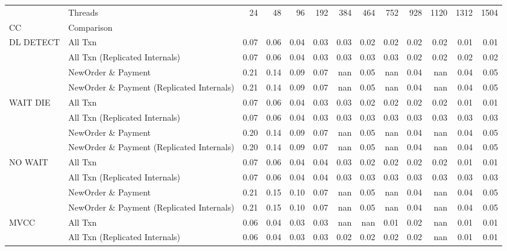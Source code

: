 \begin{tabular}{llrrrrrrrrrrr}
\toprule
       & Threads &  24   &  48   &  96   &  192  &  384  &  464  &  752  &  928  &  1120 &  1312 &  1504 \\
CC & Comparison &       &       &       &       &       &       &       &       &       &       &       \\
\midrule
DL DETECT & All Txn &  0.07 &  0.06 &  0.04 &  0.03 &  0.03 &  0.02 &  0.02 &  0.02 &  0.02 &  0.01 &  0.01 \\
       & All Txn (Replicated Internals) &  0.07 &  0.06 &  0.04 &  0.03 &  0.03 &  0.03 &  0.03 &  0.02 &  0.02 &  0.02 &  0.02 \\
       & NewOrder \& Payment &  0.21 &  0.14 &  0.09 &  0.07 &   nan &  0.05 &   nan &  0.04 &   nan &  0.04 &  0.05 \\
       & NewOrder \& Payment (Replicated Internals) &  0.21 &  0.14 &  0.09 &  0.07 &   nan &  0.05 &   nan &  0.04 &   nan &  0.04 &  0.05 \\
WAIT DIE & All Txn &  0.07 &  0.06 &  0.04 &  0.03 &  0.03 &  0.02 &  0.02 &  0.02 &  0.02 &  0.01 &  0.01 \\
       & All Txn (Replicated Internals) &  0.07 &  0.06 &  0.04 &  0.03 &  0.03 &  0.03 &  0.03 &  0.03 &  0.03 &  0.03 &  0.03 \\
       & NewOrder \& Payment &  0.20 &  0.14 &  0.09 &  0.07 &   nan &  0.05 &   nan &  0.04 &   nan &  0.04 &  0.05 \\
       & NewOrder \& Payment (Replicated Internals) &  0.20 &  0.14 &  0.09 &  0.07 &   nan &  0.05 &   nan &  0.04 &   nan &  0.04 &  0.05 \\
NO WAIT & All Txn &  0.07 &  0.06 &  0.04 &  0.04 &  0.03 &  0.02 &  0.02 &  0.02 &  0.02 &  0.01 &  0.01 \\
       & All Txn (Replicated Internals) &  0.07 &  0.06 &  0.04 &  0.04 &  0.03 &  0.03 &  0.03 &  0.03 &  0.03 &  0.03 &  0.03 \\
       & NewOrder \& Payment &  0.21 &  0.15 &  0.10 &  0.07 &   nan &  0.05 &   nan &  0.04 &   nan &  0.04 &  0.05 \\
       & NewOrder \& Payment (Replicated Internals) &  0.21 &  0.15 &  0.10 &  0.07 &   nan &  0.05 &   nan &  0.04 &   nan &  0.04 &  0.05 \\
MVCC & All Txn &  0.06 &  0.04 &  0.03 &  0.03 &   nan &   nan &  0.01 &  0.02 &   nan &  0.01 &  0.01 \\
       & All Txn (Replicated Internals) &  0.06 &  0.04 &  0.03 &  0.03 &  0.02 &  0.02 &  0.02 &  0.02 &   nan &  0.01 &  0.01 \\

\end{tabular}
